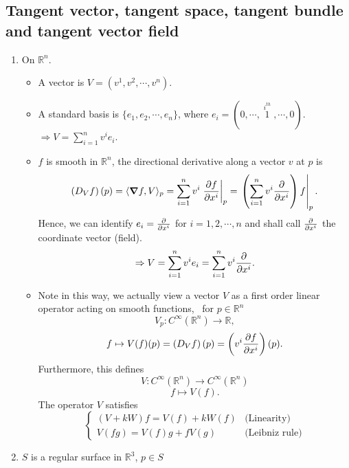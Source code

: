\subsection*{Tangent vector, tangent space, tangent bundle and tangent vector field}
\begin{enumerate}[(1)]
    \item On \(\mathbb{R}^n\).
    \begin{itemize}
        \item A vector is \(V=(v^1,v^2,\cdots,v^n)\).
        \item A standard basis is \(\{e_1,e_2,\cdots,e_n\}\), where 
        \(e_i=(0,\cdots,\mathop{1}\limits^{i^{th}},\cdots,0)\).\\
        \(\Rightarrow V=\sum_{i=1}^n v^i e_i\).
        \item \(f\) is smooth in \(\mathbb{R}^n\), the directional 
        derivative  along a vector \(v\) at \(p\) is 
        \[
            \left(D_V f\right)(p)=\langle\grad f,V\rangle_p
                =\sum_{i=1}^n v^i\left.\pdv{f}{x^i}\right|_p  
                =\left.\left(\sum_{i=1}^n v^i\pdv{x^i}\right)f\right|_p.
        \]
        Hence, we can identify \(e_i=\pdv{x^i}\) for \(i=1,2,\cdots,n\)
        and shall call \(\pdv{x^i}\) the coordinate vector (field).
        \[
            \Rightarrow V=\sum_{i=1}^n  v^i e_i=\sum_{i=1}^n v^i\pdv
            {x^i}.   
        \]
        \item Note in this way, we actually view a vector \(V\) as a 
        first order linear operator acting on smooth functions, \ie\ 
        for \(p\in \mathbb{R}^n\)
        \[
            V_p \colon  C^\infty\left(\mathbb{R}^n\right)\to \mathbb{R}
        ,\]
        \[ 
            f\mapsto  V(f)(p)=\left(D_V f\right)(p)=\left(v^i\pdv{f}{x^i}
            \right)(p)
        .\]
         Furthermore, this defines
         \[
            V\colon C^\infty\left(\mathbb{R}^n\right)\to 
            C^\infty\left(\mathbb{R}^n\right)   
         \]
         \[
            f\mapsto V(f)   
         .\]
        The operator \(V\) satisfies
        \[
            \begin{cases}
                (V+k W)f=V(f)+kW(f)&\text{(Linearity)}\\
                V(fg)=V(f)g +f V(g)&\text{(Leibniz rule)}
            \end{cases}    
        \]
    \end{itemize}
    \item \(S\) is a regular surface in \(\mathbb{R}^3\), \(p\in S\)
    \begin{itemize}

\end{itemize}
\end{enumerate}

